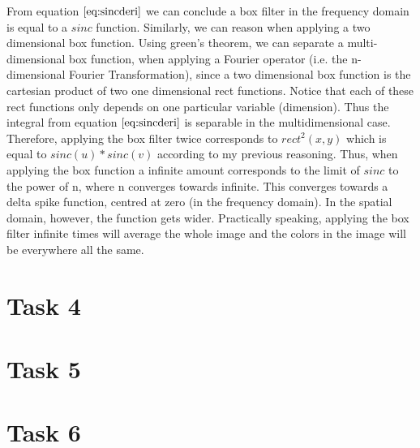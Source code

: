 \documentclass{paper}
\begin{document}
From equation $\ref{eq:sincderi}$ we can conclude a box filter in the frequency domain is equal to a $sinc$ function. Similarly, we can reason when applying a two dimensional box function. Using green's theorem, we can separate a multi-dimensional box function, when applying a Fourier operator (i.e. the n-dimensional Fourier Transformation), since a two dimensional box function is the cartesian product of two one dimensional rect functions. Notice that each of these rect functions only depends on one particular variable (dimension). Thus the integral from equation $\ref{eq:sincderi}$ is separable in the multidimensional case. Therefore, applying the box filter twice corresponds to $rect^2(x,y)$ which is equal to $sinc(u)*sinc(v)$ according to my previous reasoning. Thus, when applying the box function a infinite amount corresponds to the limit of $sinc$ to the power of n, where n converges towards infinite. This converges towards a delta spike function, centred at zero (in the frequency domain). In the spatial domain, however, the function gets wider. Practically speaking, applying the box filter infinite times will average the whole image and  the colors in the image will be everywhere all the same.


\section*{Task 4}
\section*{Task 5}




\section*{Task 6}
\end{document}
